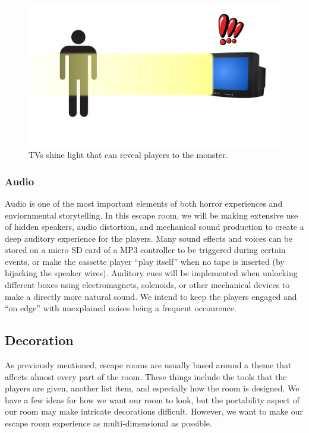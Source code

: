 \documentclass[conference]{IEEEtran}
\begin{document}
\begin{figure}[ht]
    \centering
    \includegraphics[width=0.90\columnwidth]{Images/tvsketch.png}
    \caption{TVs shine light that can reveal players to the monster.}
\end{figure}

\subsubsection*{Audio}
Audio is one of the most important elements of both horror experiences and enviornmental storytelling.
In this escape room, we will be making extensive use of hidden speakers, audio distortion, and mechanical
sound production to create a deep auditory experience for the players. Many sound effects and voices can
be stored on a micro SD card of a MP3 controller to be triggered during certain events, or make the
cassette player ``play itself'' when no tape is inserted (by hijacking the speaker wires). Auditory cues
will be implemented when unlocking different boxes using electromagnets, solenoids, or other mechanical
devices to make a directly more natural sound. We intend to keep the players engaged and ``on edge'' with
unexplained noises being a frequent occourence.

\subsection*{Decoration}
As previously mentioned, escape rooms are usually based around a theme that affects almost
every part of the room. These things include the tools that the players are given, another list item,
and especially how the room is designed. We have a few ideas for how we want our room to look, but
the portability aspect of our room may make intricate decorations difficult. However, we want to make
our escape room experience as multi-dimensional as possible.
\end{document}
